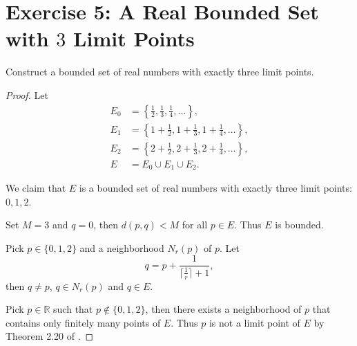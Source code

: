 \documentclass{amsbook}
\theoremstyle{definition}
\theoremstyle{remark}
\numberwithin{section}{chapter}
\numberwithin{equation}{chapter}
\begin{document}
\section{Exercise 5: A Real Bounded Set with $3$ Limit Points}
Construct a bounded set of real numbers with exactly three limit points.
\begin{proof}
Let\[
\begin{split}
E_0&=\left\{\frac{1}{2},\frac{1}{3},\frac{1}{4},\dots\right\},\\
E_1&=\left\{1+\frac{1}{2},1+\frac{1}{3},1+\frac{1}{4},\dots\right\},\\
E_2&=\left\{2+\frac{1}{2},2+\frac{1}{3},2+\frac{1}{4},\dots\right\},\\
E&=E_0\cup E_1\cup E_2.
\end{split}
\]

We claim that $E$ is a bounded set of real numbers with exactly three limit points: $0,1,2$.

Set $M=3$ and $q=0$, then $d(p,q)<M$ for all $p\in E$. Thus $E$ is bounded.

Pick $p\in\{0,1,2\}$ and a neighborhood $N_r(p)$ of $p$. Let\[
q=p+\frac{1}{\lceil \frac{1}{r}\rceil+1},
\]then $q\ne p$, $q\in N_r(p)$ and $q\in E$.

Pick $p\in \mathbb{R}$ such that $p\not\in\{0,1,2\}$, then there exists a neighborhood of $p$ that contains only finitely many points of $E$. Thus $p$ is not a limit point of $E$ by Theorem 2.20 of \cite{rudin1976principles}.
\end{proof}
\end{document}
